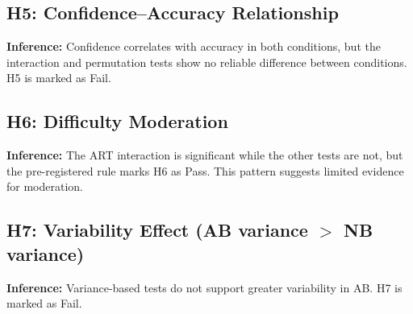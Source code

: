 \documentclass[11pt]{article}
\begin{document}
\subsection{H5: Confidence--Accuracy Relationship}
\begin{table}[htbp]
\centering
\caption{H5 tests}
\end{table}
\textbf{Inference:} Confidence correlates with accuracy in both conditions, but the interaction and permutation tests show no reliable difference between conditions. H5 is marked as Fail.

\subsection{H6: Difficulty Moderation}
\begin{table}[htbp]
\centering
\caption{H6 tests}
\end{table}
\textbf{Inference:} The ART interaction is significant while the other tests are not, but the pre-registered rule marks H6 as Pass. This pattern suggests limited evidence for moderation.

\subsection{H7: Variability Effect (AB variance $>$ NB variance)}
\begin{table}[htbp]
\centering
\caption{H7 tests}
\end{table}
\textbf{Inference:} Variance-based tests do not support greater variability in AB. H7 is marked as Fail.
\end{document}
